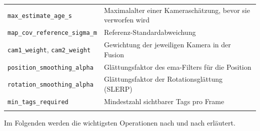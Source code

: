{\begin{longtable}{@{}l p{}@{}}
\texttt{max\_estimate\_age\_s}           & Maximalalter einer Kameraschätzung, bevor sie verworfen wird \\
\texttt{map\_cov\_reference\_sigma\_m}    & Referenz-Standardabweichung \\
\texttt{cam1\_weight}, \texttt{cam2\_weight} & Gewichtung der jeweiligen Kamera in der Fusion \\
\texttt{position\_smoothing\_alpha}      & Glättungsfaktor des \gls{ema}-Filters für die Position \\
\texttt{rotation\_smoothing\_alpha}      & Glättungsfaktor der Rotationsglättung (SLERP) \\
\texttt{min\_tags\_required}             & Mindestzahl sichtbarer Tags pro Frame\\
\addlinespace

\end{longtable}
}

Im Folgenden werden die wichtigsten Operationen nach und nach erläutert. 

